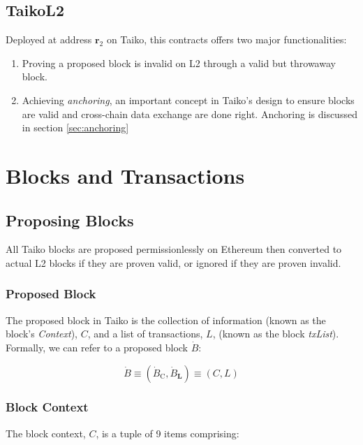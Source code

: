 \documentclass[9pt,oneside]{amsart}
\begin{document}
\begin{multicols}{2}
\subsection{TaikoL2} Deployed at address $\mathbf{r_{\mathrm{2}}}$ on Taiko, this contracts offers two major functionalities:
\begin{enumerate}
\item Proving a proposed block is invalid on L2 through a valid but throwaway block.
\item Achieving \textit{anchoring}, an important concept in Taiko's design to ensure blocks are valid and cross-chain data exchange are done right. Anchoring is discussed in section \ref{sec:anchoring}
\end{enumerate}

\section{Blocks and Transactions}

\subsection{Proposing Blocks}
All Taiko blocks are proposed permissionlessly on Ethereum then converted to actual L2 blocks if they are proven valid, or ignored if they are proven invalid.

\subsubsection{Proposed Block} The proposed block in Taiko is the collection of information (known as the block's \textit{Context}), $C$, and a list of transactions, $L$,  (known as the block \textit{txList}). Formally, we can refer to a proposed block $\dot{B}$:

\begin{equation}
\dot{B} \equiv (\dot{B}_{\mathrm{C}}, \dot{B}_{\mathbf{L}}) \equiv (C, L)
\end{equation}

\subsubsection{Block Context} The block context, $C$, is a tuple of 9 items comprising:



\end{multicols}
\end{document}
